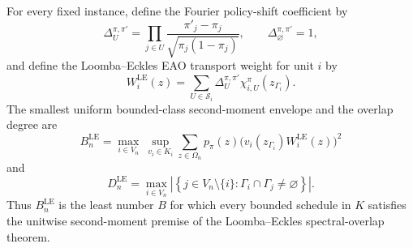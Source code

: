 For every fixed instance, define the Fourier policy-shift coefficient by
\[
 \Delta_U^{\pi,\pi'}
 =\prod_{j\in U}\frac{\pi'_j-\pi_j}{\sqrt{\pi_j(1-\pi_j)}},
 \qquad \Delta_{\varnothing}^{\pi,\pi'}=1,
\]
and define the Loomba--Eckles EAO transport weight for unit \(i\) by
\[
 W_i^{\mathrm{LE}}(z)
 =\sum_{U\in\mathcal S_i}
   \Delta_U^{\pi,\pi'}\chi_{i,U}^{\pi}(z_{\Gamma_i}).
\]
The smallest uniform bounded-class second-moment envelope and the overlap degree are
\[
 B_n^{\mathrm{LE}}
 =\max_{i\in V_n}\ \sup_{v_i\in K_i}
   \sum_{z\in\Omega_n}p_{\pi}(z)
   \bigl(v_i(z_{\Gamma_i})W_i^{\mathrm{LE}}(z)\bigr)^2
\]
and
\[
 D_n^{\mathrm{LE}}
 =\max_{i\in V_n}
   \left|\left\{j\in V_n\setminus\{i\}:
   \Gamma_i\cap\Gamma_j\ne\varnothing\right\}\right|.
\]
Thus \(B_n^{\mathrm{LE}}\) is the least number \(B\) for which every bounded schedule in \(K\) satisfies the unitwise second-moment premise of the Loomba--Eckles spectral-overlap theorem.